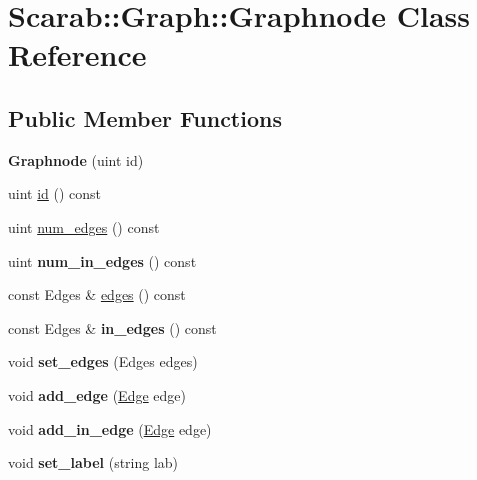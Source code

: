 \hypertarget{class_scarab_1_1_graph_1_1_graphnode}{
\section{Scarab::Graph::Graphnode Class Reference}
\label{class_scarab_1_1_graph_1_1_graphnode}
}
\subsection*{Public Member Functions}
\begin{DoxyCompactItemize}
\item 
\hypertarget{class_scarab_1_1_graph_1_1_graphnode_adce1b3b5b83d8fca4952f244bd093b9f}{
{\bfseries Graphnode} (uint id)}
\label{class_scarab_1_1_graph_1_1_graphnode_adce1b3b5b83d8fca4952f244bd093b9f}

\item 
uint \hyperlink{class_scarab_1_1_graph_1_1_graphnode_a74eaaed5d31a0a2c0445f3de0859148f}{id} () const 
\item 
uint \hyperlink{class_scarab_1_1_graph_1_1_graphnode_a78229cc45113d24f1373a50a13bc7be4}{num\_\-edges} () const 
\item 
\hypertarget{class_scarab_1_1_graph_1_1_graphnode_a717294ebbae2d29e9f97633407dae4ce}{
uint {\bfseries num\_\-in\_\-edges} () const }
\label{class_scarab_1_1_graph_1_1_graphnode_a717294ebbae2d29e9f97633407dae4ce}

\item 
const Edges \& \hyperlink{class_scarab_1_1_graph_1_1_graphnode_a4ffd990052c812242cbdeeae7b0e1104}{edges} () const 
\item 
\hypertarget{class_scarab_1_1_graph_1_1_graphnode_a001915a0fd7a6d4b06886f7865fc5189}{
const Edges \& {\bfseries in\_\-edges} () const }
\label{class_scarab_1_1_graph_1_1_graphnode_a001915a0fd7a6d4b06886f7865fc5189}

\item 
\hypertarget{class_scarab_1_1_graph_1_1_graphnode_ae37c75fd607395376ade1cda5294e2a4}{
void {\bfseries set\_\-edges} (Edges edges)}
\label{class_scarab_1_1_graph_1_1_graphnode_ae37c75fd607395376ade1cda5294e2a4}

\item 
\hypertarget{class_scarab_1_1_graph_1_1_graphnode_a22e722e5bcd49dcfa643304d631416dc}{
void {\bfseries add\_\-edge} (\hyperlink{class_scarab_1_1_graph_1_1_graphedge}{Edge} edge)}
\label{class_scarab_1_1_graph_1_1_graphnode_a22e722e5bcd49dcfa643304d631416dc}

\item 
\hypertarget{class_scarab_1_1_graph_1_1_graphnode_a092b914639364b7b9168c84e3e556cea}{
void {\bfseries add\_\-in\_\-edge} (\hyperlink{class_scarab_1_1_graph_1_1_graphedge}{Edge} edge)}
\label{class_scarab_1_1_graph_1_1_graphnode_a092b914639364b7b9168c84e3e556cea}

\item 
\hypertarget{class_scarab_1_1_graph_1_1_graphnode_a7ec0926462b47496b1158f16b87e69ca}{
void {\bfseries set\_\-label} (string lab)}
\label{class_scarab_1_1_graph_1_1_graphnode_a7ec0926462b47496b1158f16b87e69ca}

\end{DoxyCompactItemize}



